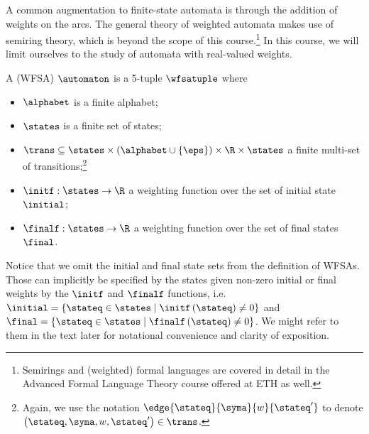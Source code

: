 A common augmentation to finite-state automata is through the addition of weights on the arcs.
The general theory of weighted automata makes use of semiring theory, which is beyond the scope of this course.\footnote{Semirings and (weighted) formal languages are covered in detail in the Advanced Formal Language Theory course offered at ETH as well.}
In this course, we will limit ourselves to the study of automata with real-valued weights.
\begin{definition}
A  (WFSA) $\automaton$ is a 5-tuple $\wfsatuple$ where 
\begin{itemize}
    \item $\alphabet$ is a finite alphabet; 
    \item $\states$ is a finite set of states;
    \item $\trans \subseteq \states \times \left( \alphabet \cup \left\{ \eps \right\} \right) \times \R \times \states$ a finite multi-set of transitions;\footnote{Again, we use the notation $\edge{\stateq}{\syma}{w}{\stateq'}$ to denote $\left(\stateq, \syma, w, \stateq'\right) \in \trans$.}
    \item $\initf : \states \rightarrow \R$ a weighting function over the set of initial state $\initial$;
    \item $\finalf : \states \rightarrow \R$ a weighting function over the set of final states $\final$.
\end{itemize}
\end{definition}
Notice that we omit the initial and final state sets from the definition of WFSAs.
Those can implicitly be specified by the states given non-zero initial or final weights by the $\initf$ and $\finalf$ functions, i.e. $\initial = \left\{\stateq \in \states \mid \initf\left(\stateq\right) \neq 0\right\}$ and $\final = \left\{\stateq \in \states \mid \finalf\left(\stateq\right) \neq 0\right\}$.
We might refer to them in the text later for notational convenience and clarity of exposition.

